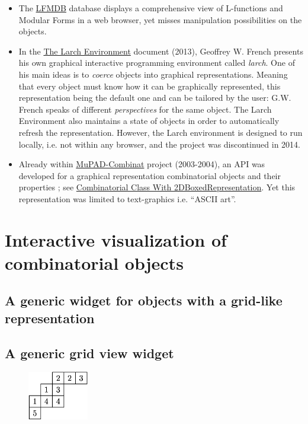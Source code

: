 \documentclass{deliverablereport}
\begin{document}
\begin{itemize}
\item The \href{http://www.lmfdb.org/}{LFMDB} database displays a comprehensive view of L-functions and Modular Forms in a web browser, yet misses manipulation possibilities on the objects.
\item In the \href{https://core.ac.uk/download/pdf/9839511.pdf}{The
  Larch Environment} document (2013), Geoffrey W. French presents his own graphical
  interactive programming environment called \emph{larch}.
  One of his main ideas is to
  \emph{coerce} objects into graphical representations. Meaning that
  every object must know how it can be graphically represented, this
  representation being the default one and can be tailored by the
  user: G.W. French speaks of different \emph{perspectives} for the
  same object. The Larch Environment also maintains a state of objects
  in order to automatically refresh the representation.
  However, the Larch environment is designed to run locally, i.e. not
  within any browser, and the project was discontinued in 2014.
\item Already within
  \href{http://mupad-combinat.sourceforge.net}{MuPAD-Combinat} project
  (2003-2004), an API was developed for a graphical representation
  combinatorial objects and their properties ; see
  \href{http://mupad-combinat.sourceforge.net/doc/en/Cat_Combinat/CombinatorialClassWith2DBoxedRepresentation.html}{Combinatorial
    Class With 2DBoxedRepresentation}. Yet this representation was
  limited to text-graphics i.e. ``ASCII art''.
\end{itemize}

\section{Interactive visualization of combinatorial objects}
\label{section:combi}

\subsection{A generic widget for objects with a grid-like representation}
\label{grid}

\subsection{A generic grid view widget}

\begin{figure}
    \begin{center}
      \includegraphics[width=100px]{images/JDTSlide}
\end{center}
\end{figure}
\end{document}
